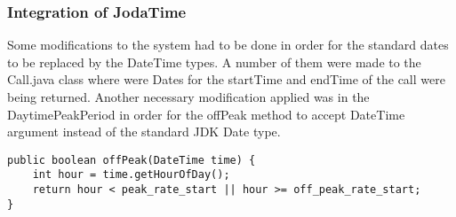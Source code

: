 \subsubsection*{Integration of JodaTime}
Some modifications to the system had to be done in order for the standard dates to be replaced by the DateTime types. A number of them were made to the Call.java class where were Dates for the startTime and endTime of the call were being returned. Another necessary modification applied was in the DaytimePeakPeriod in order for the offPeak method to accept DateTime argument instead of the standard JDK Date type.
\begin{lstlisting}
public boolean offPeak(DateTime time) {     
	int hour = time.getHourOfDay();
	return hour < peak_rate_start || hour >= off_peak_rate_start;
}
\end{lstlisting}
